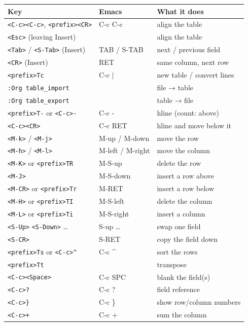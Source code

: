 \begin{center}
\begin{tabular}{lll}
Key & Emacs & What it does\\
\hline
\texttt{<C-c><C-c>}, \texttt{<prefix><CR>} & C-c C-c & align the table\\
\texttt{<Esc>} (leaving Insert) &  & align the table\\
\texttt{<Tab>} / \texttt{<S-Tab>} (Insert) & TAB / S-TAB & next / previous field\\
\texttt{<CR>} (Insert) & RET & same column, next row\\
\texttt{<prefix>Tc} & C-c \(\vert{}\) & new table / convert lines\\
\texttt{:Org table\_import} &  & file → table\\
\texttt{:Org table\_export} &  & table → file\\
\texttt{<prefix>T-} or \texttt{<C-c>-} & C-c - & hline (count: above)\\
\texttt{<C-c><CR>} & C-c RET & hline and move below it\\
\texttt{<M-k>} / \texttt{<M-j>} & M-up / M-down & move the row\\
\texttt{<M-h>} / \texttt{<M-l>} & M-left / M-right & move the column\\
\texttt{<M-K>} or \texttt{<prefix>TR} & M-S-up & delete the row\\
\texttt{<M-J>} & M-S-down & insert a row above\\
\texttt{<M-CR>} or \texttt{<prefix>Tr} & M-RET & insert a row below\\
\texttt{<M-H>} or \texttt{<prefix>TI} & M-S-left & delete the column\\
\texttt{<M-L>} or \texttt{<prefix>Ti} & M-S-right & insert a column\\
\texttt{<S-Up>} \texttt{<S-Down>} \ldots{} & S-up \ldots{} & swap one field\\
\texttt{<S-CR>} & S-RET & copy the field down\\
\texttt{<prefix>Ts} or \texttt{<C-c>\textasciicircum{}} & C-c \^{} & sort the rows\\
\texttt{<prefix>Tt} &  & transpose\\
\texttt{<C-c><Space>} & C-c SPC & blank the field(s)\\
\texttt{<C-c>?} & C-c ? & field reference\\
\texttt{<C-c>\}} & C-c \} & show row/column numbers\\
\texttt{<C-c>+} & C-c + & sum the column\\

\end{tabular}
\end{center}
